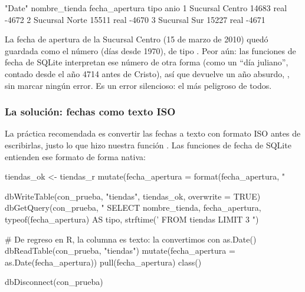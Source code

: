 
\begin{rsalida}
[1] "Date"
    nombre_tienda fecha_apertura tipo  anio
1 Sucursal Centro          14683 real -4672
2  Sucursal Norte          15511 real -4670
3    Sucursal Sur          15227 real -4671
\end{rsalida}

La fecha de apertura de la Sucursal Centro (15 de marzo de 2010) quedó
guardada como el número  (días desde 1970), de tipo
. Peor aún: las funciones de fecha de SQLite interpretan ese
número de otra forma (como un ``día juliano'', contado desde el año 4714
antes de Cristo), así que  devuelve un año
absurdo, , sin marcar ningún error. Es un error silencioso: el
más peligroso de todos.

\subsubsection{La solución: fechas como texto ISO}

La práctica recomendada es convertir las fechas a texto con formato ISO
 antes de escribirlas, justo lo que hizo nuestra
función . Las funciones de fecha de SQLite
entienden ese formato de forma nativa:

\begin{rcode}
tiendas_ok <- tiendas_r %
  mutate(fecha_apertura = format(fecha_apertura, "%

dbWriteTable(con_prueba, "tiendas", tiendas_ok, overwrite = TRUE)
dbGetQuery(con_prueba, "
  SELECT nombre_tienda, fecha_apertura,
         typeof(fecha_apertura)             AS tipo,
         strftime('%
  FROM tiendas
  LIMIT 3
")

# De regreso en R, la columna es texto: la convertimos con as.Date()
dbReadTable(con_prueba, "tiendas") %
  mutate(fecha_apertura = as.Date(fecha_apertura)) %
  pull(fecha_apertura) %
  class()

dbDisconnect(con_prueba)
\end{rcode}

